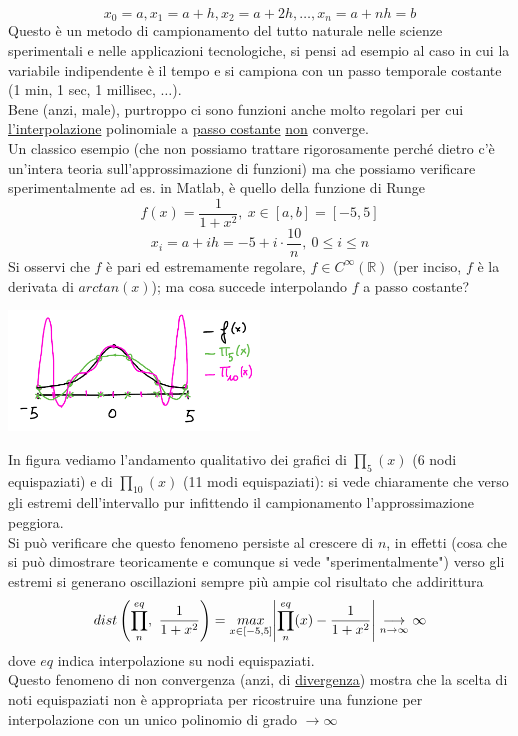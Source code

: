 \documentclass[12pt]{article}
\DeclarePairedDelimiter{\abs}{\lvert}{\rvert}
\begin{document}
\[
x_0 = a, x_1 = a+h, x_2 = a+2h, \dotso, x_n = a+nh = b
\]
Questo è un metodo di campionamento del tutto naturale nelle scienze sperimentali e nelle applicazioni tecnologiche, si pensi ad esempio al caso in cui la variabile indipendente è il tempo e si campiona con un passo temporale costante (1 min, 1 sec, 1 millisec, $\dotso$).\\
Bene (anzi, male), purtroppo ci sono funzioni anche molto regolari per cui \underline{l'interpolazione} polinomiale a \underline{passo costante} \underline{non} converge.\\
Un classico esempio (che non possiamo trattare rigorosamente perché dietro c'è un'intera teoria sull'approssimazione di funzioni) ma che possiamo verificare sperimentalmente ad es. in Matlab, è quello della funzione di Runge
\[
f(x) = \frac{1}{1+x^2}, \ x \in [a,b] = [-5,5]
\]
\[
x_i = a+ih = -5+i \cdot \frac{10}{n}, \ 0 \leq i \leq n
\]
Si osservi che $f$ è pari ed estremamente
regolare, $f \in C^\infty (\mathbb{R})$ (per inciso, $f$ è la derivata di $arctan(x)$); ma cosa succede interpolando $f$ a passo costante?
\begin{center}
    \includegraphics[width=0.5\textwidth]{pag39.PNG}
\end{center}
In figura vediamo l'andamento qualitativo dei grafici di $\prod_5(x)$ (6 nodi equispaziati) e di $\prod_{10}(x)$ (11 modi equispaziati): si vede chiaramente che verso gli estremi dell'intervallo pur infittendo il campionamento l'approssimazione peggiora.\\
Si può verificare che questo fenomeno persiste al crescere di $n$, in effetti (cosa che si può dimostrare teoricamente e comunque si vede "sperimentalmente") verso gli estremi si generano oscillazioni sempre più ampie col risultato che addirittura
\[
dist\left(\prod_n^{eq},\ \frac{1}{1+x^2}\right) = \underset{x \in [-5,5]}{max} \abs*{\prod_n^{eq}(x) - \frac{1}{1+x^2}}\underset{n \to \infty}{\longrightarrow} \infty
\] %
dove $eq$ indica interpolazione su nodi equispaziati.\\
Questo fenomeno di non convergenza (anzi, di \underline{divergenza}) mostra che la scelta di noti equispaziati non è appropriata per ricostruire una funzione per interpolazione con un unico polinomio di grado $\to \infty$
\end{document}
